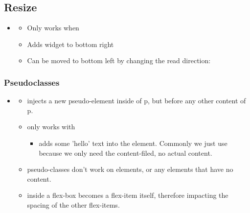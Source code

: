 \subsection{Resize}
\begin{itemize}
    \item {} \begin{itemize}
        \item Only works when 
        \item Adds widget to bottom right
        \item Can be moved to bottom left by changing the read direction: 
    \end{itemize}
\end{itemize}

\subsubsection{Pseudoclasses}
\begin{itemize}
    \item {} \begin{itemize}
        \item injects a new pseudo-element inside of p, but before any other content of p.
        \item only works with  \begin{itemize}
            \item {} adds some 'hello' text into the element. Commonly we just use  because we only need the content-filed, no actual content.
        \end{itemize}
        \item pseudo-classes don't work on  elements, or any elements that have no content.
        \item {} inside a flex-box becomes a flex-item itself, therefore impacting the spacing of the other flex-items.
    \end{itemize}
\end{itemize}


